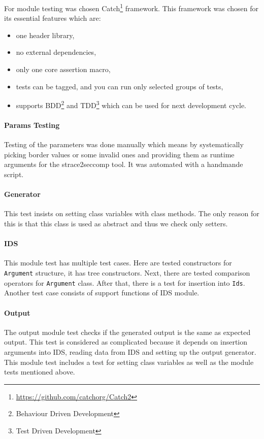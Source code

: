 For module testing was chosen Catch\footnote{\url{https://github.com/catchorg/Catch2}}
framework. This framework was chosen for its essential features which are:
\begin{itemize}
	\item one header library,
	\item no external dependencies,
	\item only one core assertion macro,
	\item tests can be tagged, and you can run only selected groups of tests,
	\item supports BDD\footnote{Behaviour Driven Development} and
	TDD\footnote{Test Driven Development} which can be used for next development
	cycle.
\end{itemize}

\paragraph{Params Testing}
Testing of the parameters was done manually which means by systematically
picking border values or some invalid ones and providing them as runtime
arguments for the strace2seccomp tool. It was automated with a handmande script.

\paragraph{Generator}
This test insists on setting class variables with class methods. The only reason
for this is that this class is used as abstract and thus we check only setters.

\paragraph{IDS}
This module test has multiple test cases. Here are tested constructors for
\texttt{Argument} structure, it has tree constructors. Next, there are tested
comparison operators for \texttt{Argument} class. After that, there is a test
for insertion into \texttt{Ids}. Another test case consists of support
functions of IDS module.

\paragraph{Output}
The output module test checks if the generated output is the same as expected
output. This test is considered as complicated because it depends on insertion
arguments into IDS, reading data from IDS and setting up the output generator.
This module test includes a test for setting class variables as well as the
module tests mentioned above.

